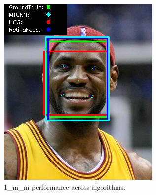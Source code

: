 \documentclass{l4proj}
\begin{document}
\begin{appendices}
\begin{figure}[h!]
\begin{minipage}{0.49\textwidth}
     \includegraphics[width=\textwidth]{images/appendix/1.png}
    \caption{1\_m\_m performance across algorithms.}
    \label{whoopi_result}
  \end{minipage}
\end{figure}


\end{appendices}
\end{document}
